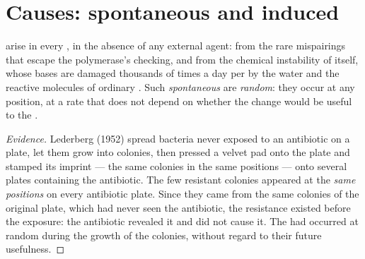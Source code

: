 \section{Causes: spontaneous and induced}

\begin{proposition}\label{prop:g11:mutations:spontaneous}
 arise in every , in the absence of any external agent:
from the rare mispairings that escape the polymerase's checking, and
from the chemical instability of  itself, whose bases are damaged
thousands of times a day per  by the water and the reactive
molecules of ordinary . Such \emph{spontaneous }
are \emph{random}: they occur at any position, at a rate that does not
depend on whether the change would be useful to the .
\end{proposition}
\begin{proof}[Evidence]
Lederberg (1952) spread bacteria never exposed to an antibiotic on a
plate, let them grow into colonies, then pressed a velvet pad onto the
plate and stamped its imprint --- the same colonies in the same
positions --- onto several plates containing the antibiotic. The few
resistant colonies appeared at the \emph{same positions} on every
antibiotic plate. Since they came from the same colonies of the
original plate, which had never seen the antibiotic, the resistance
 existed before the exposure: the antibiotic revealed it and
did not cause it. The  had occurred at random during the
growth of the colonies, without regard to their future usefulness.
\end{proof}


